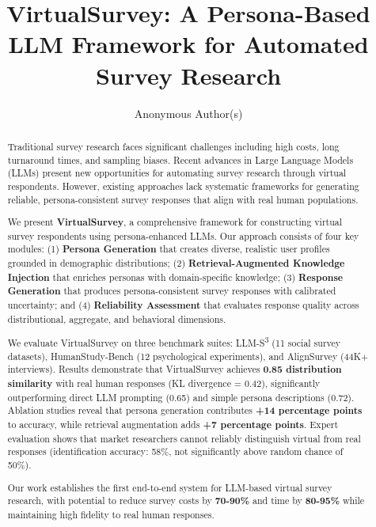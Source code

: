 \documentclass[sigconf,nonarchival]{acmart}
\title{VirtualSurvey: A Persona-Based LLM Framework for Automated Survey Research}
\author{Anonymous Author(s)}
\affiliation{%
  \institution{Anonymous Institution}
  \city{City}
  \country{Country}
}
\begin{document}
\begin{abstract}
Traditional survey research faces significant challenges including high costs, long turnaround times, and sampling biases. Recent advances in Large Language Models (LLMs) present new opportunities for automating survey research through virtual respondents. However, existing approaches lack systematic frameworks for generating reliable, persona-consistent survey responses that align with real human populations.

We present \textbf{VirtualSurvey}, a comprehensive framework for constructing virtual survey respondents using persona-enhanced LLMs. Our approach consists of four key modules: (1) \textbf{Persona Generation} that creates diverse, realistic user profiles grounded in demographic distributions; (2) \textbf{Retrieval-Augmented Knowledge Injection} that enriches personas with domain-specific knowledge; (3) \textbf{Response Generation} that produces persona-consistent survey responses with calibrated uncertainty; and (4) \textbf{Reliability Assessment} that evaluates response quality across distributional, aggregate, and behavioral dimensions.

We evaluate VirtualSurvey on three benchmark suites: LLM-S\textsuperscript{3} (11 social survey datasets), HumanStudy-Bench (12 psychological experiments), and AlignSurvey (44K+ interviews). Results demonstrate that VirtualSurvey achieves \textbf{0.85 distribution similarity} with real human responses (KL divergence = 0.42), significantly outperforming direct LLM prompting (0.65) and simple persona descriptions (0.72). Ablation studies reveal that persona generation contributes \textbf{+14 percentage points} to accuracy, while retrieval augmentation adds \textbf{+7 percentage points}. Expert evaluation shows that market researchers cannot reliably distinguish virtual from real responses (identification accuracy: 58\%, not significantly above random chance of 50\%).

Our work establishes the first end-to-end system for LLM-based virtual survey research, with potential to reduce survey costs by \textbf{70-90\%} and time by \textbf{80-95\%} while maintaining high fidelity to real human responses.
\end{abstract}


\maketitle
\end{document}
